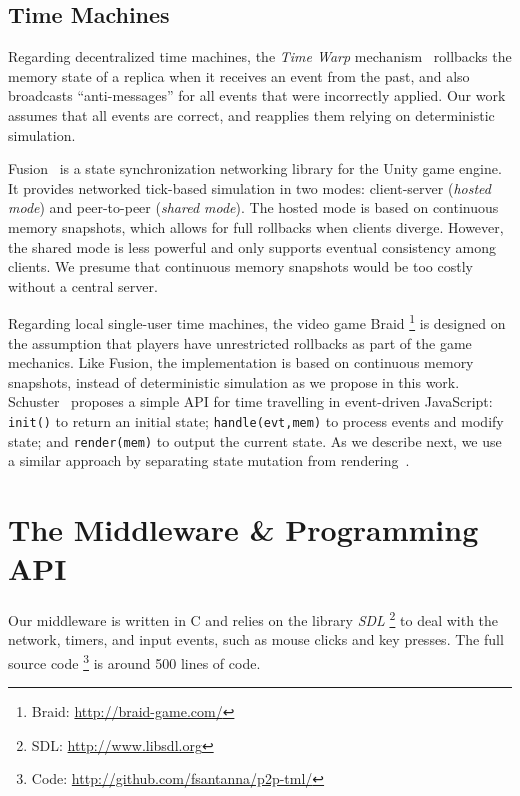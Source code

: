 \documentclass[10pt,journal,compsoc]{IEEEtran}
\newcommand{\code}[1]  {\texttt{\small{#1}}}
\begin{document}
\subsection{Time Machines}

Regarding decentralized time machines, the \emph{Time Warp}
mechanism~\cite{timewarp} rollbacks the memory state of a replica when it
receives an event from the past, and also broadcasts ``anti-messages'' for all
events that were incorrectly applied.
Our work assumes that all events are correct, and reapplies them relying on
deterministic simulation.

Fusion~\cite{fusion} is a state synchronization networking library for the
Unity game engine.
It provides networked tick-based simulation in two modes: client-server
(\emph{hosted mode}) and peer-to-peer (\emph{shared mode}).
The hosted mode is based on continuous memory snapshots, which allows for
full rollbacks when clients diverge.
However, the shared mode is less powerful and only supports eventual
consistency among clients.
We presume that continuous memory snapshots would be too costly without a
central server.

Regarding local single-user time machines, the video game Braid%
\footnote{Braid: \url{http://braid-game.com/}}
is designed on the assumption that players have unrestricted rollbacks as part
of the game mechanics.
Like Fusion, the implementation is based on continuous memory snapshots,
instead of deterministic simulation as we propose in this work.
%
Schuster~\cite{tml.js} proposes a simple API for time travelling in
event-driven JavaScript:
    \code{init()} to return an initial state;
    \code{handle(evt,mem)} to process events and modify state; and
    \code{render(mem)} to output the current state.
As we describe next, we use a similar approach by separating state mutation
from rendering~\cite{tml.alive}.

\section{The Middleware \& Programming API}
\label{sec.tml}

Our middleware is written in C and relies on the library \emph{SDL}%
\footnote{SDL: \url{http://www.libsdl.org}}
to deal with the network, timers, and input events, such as mouse clicks and
key presses.
The full source code%
\footnote{Code: \url{http://github.com/fsantanna/p2p-tml/}}
is around 500 lines of code.
\end{document}
